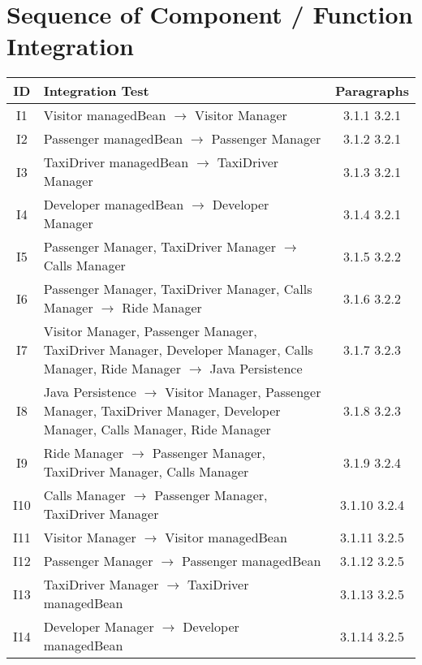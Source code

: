 \section{Sequence of Component / Function Integration}

\begin{table}[!htbp]
\begin{center}
\begin{tabular}[t]{c|p{}|c}

\textbf{ID} & \textbf{Integration Test} & \textbf{Paragraphs} \\
\hline
I1 & Visitor managedBean $\rightarrow$ Visitor Manager & 3.1.1  3.2.1 \\
\hline
I2 & Passenger managedBean $\rightarrow$ Passenger Manager & 3.1.2  3.2.1 \\
\hline
I3 & TaxiDriver managedBean $\rightarrow$ TaxiDriver Manager & 3.1.3  3.2.1 \\
\hline
I4 & Developer managedBean $\rightarrow$ Developer Manager & 3.1.4  3.2.1 \\
\hline
I5 & Passenger Manager, TaxiDriver Manager $\rightarrow$ Calls Manager & 3.1.5  3.2.2\\
\hline
I6 & Passenger Manager, TaxiDriver Manager, Calls Manager $\rightarrow$ Ride Manager & 3.1.6  3.2.2\\
\hline
I7 & Visitor Manager, Passenger Manager, TaxiDriver Manager, Developer Manager, Calls Manager, Ride Manager $\rightarrow$ Java Persistence & 3.1.7  3.2.3 \\
\hline
I8 & Java Persistence $\rightarrow$ Visitor Manager, Passenger Manager, TaxiDriver Manager, Developer Manager, Calls Manager, Ride Manager & 3.1.8  3.2.3 \\
\hline
I9 &  Ride Manager $\rightarrow$ Passenger Manager, TaxiDriver Manager, Calls Manager & 3.1.9  3.2.4\\
\hline
I10 & Calls Manager $\rightarrow$ Passenger Manager, TaxiDriver Manager & 3.1.10  3.2.4\\
\hline
I11 & Visitor Manager $\rightarrow$ Visitor managedBean & 3.1.11  3.2.5 \\
\hline
I12 & Passenger Manager $\rightarrow$ Passenger managedBean & 3.1.12  3.2.5 \\
\hline
I13 & TaxiDriver Manager $\rightarrow$ TaxiDriver managedBean & 3.1.13  3.2.5 \\
\hline
I14 & Developer Manager $\rightarrow$ Developer managedBean & 3.1.14  3.2.5 \\
\hline

\end{tabular}
\end{center}
\end{table}
\clearpage